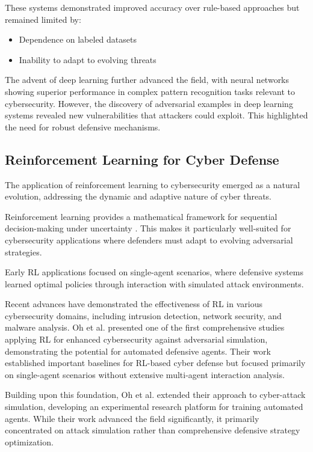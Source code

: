 \documentclass[12pt,oneside,a4paper]{article}
\theoremstyle{definition}
\theoremstyle{plain}
\begin{document}
These systems demonstrated improved accuracy over rule-based approaches but remained limited by:
\begin{itemize}
    \item Dependence on labeled datasets
    \item Inability to adapt to evolving threats
\end{itemize}

The advent of deep learning further advanced the field, with neural networks showing superior performance in complex pattern recognition tasks relevant to cybersecurity. However, the discovery of adversarial examples in deep learning systems \citep{goodfellow2014explaining} revealed new vulnerabilities that attackers could exploit. This highlighted the need for robust defensive mechanisms.

\subsection{Reinforcement Learning for Cyber Defense}

The application of reinforcement learning to cybersecurity emerged as a natural evolution, addressing the dynamic and adaptive nature of cyber threats. 

Reinforcement learning provides a mathematical framework for sequential decision-making under uncertainty \citep{sutton2018reinforcement}. This makes it particularly well-suited for cybersecurity applications where defenders must adapt to evolving adversarial strategies. 

Early RL applications focused on single-agent scenarios, where defensive systems learned optimal policies through interaction with simulated attack environments.

Recent advances have demonstrated the effectiveness of RL in various cybersecurity domains, including intrusion detection, network security, and malware analysis. Oh et al. \cite{oh2023applying} presented one of the first comprehensive studies applying RL for enhanced cybersecurity against adversarial simulation, demonstrating the potential for automated defensive agents. Their work established important baselines for RL-based cyber defense but focused primarily on single-agent scenarios without extensive multi-agent interaction analysis.

Building upon this foundation, Oh et al. \cite{oh2024employing} extended their approach to cyber-attack simulation, developing an experimental research platform for training automated agents. While their work advanced the field significantly, it primarily concentrated on attack simulation rather than comprehensive defensive strategy optimization.
\end{document}
